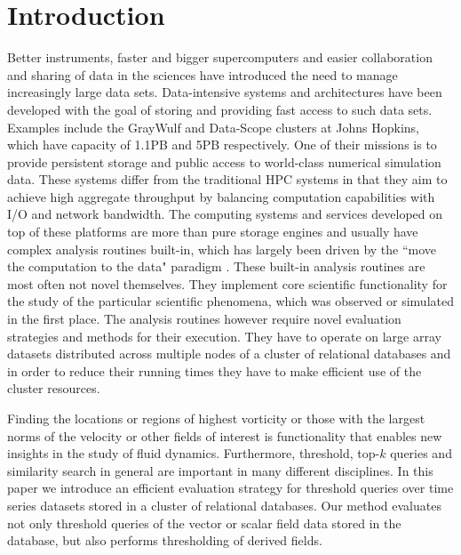 \documentclass{sig-alternate}
\begin{document}
\section{Introduction}
Better instruments, faster and bigger supercomputers and easier collaboration and sharing of data in the sciences have introduced the need
to manage increasingly large data sets. Data-intensive systems and architectures have been developed with the goal of storing and providing
fast access to such data sets. Examples include the GrayWulf and Data-Scope clusters \cite{Szalay, DataScope} at Johns Hopkins, which have capacity 
of 1.1PB and 5PB
respectively. One of their missions is to provide persistent storage and public access to world-class numerical simulation data. 
These systems differ from the traditional HPC systems in that they aim to achieve high aggregate throughput by balancing computation
capabilities with I/O and network bandwidth. The computing systems and services developed on top of these platforms are more than pure
storage engines and usually have complex analysis routines built-in, which has largely been driven by the ``move the computation to the data"
paradigm \cite{fourthparadigm}. These built-in analysis routines are most often not novel themselves. They implement core scientific functionality for the
study of the particular scientific phenomena, which was observed or simulated in the first place. The analysis routines however require novel evaluation
strategies and methods for their execution. They have to operate on large array datasets distributed across multiple nodes of a cluster of relational
databases and in order to reduce their running times they have to make efficient use of the cluster resources. 

Finding the locations or regions of highest vorticity or those with the largest norms of the velocity or other fields of interest is
functionality that enables new insights in the study of fluid dynamics. Furthermore, threshold, top-$k$ queries and similarity search in general
are important in many different disciplines. In this paper we introduce an efficient evaluation strategy for threshold
queries over time series datasets stored in a cluster of relational databases. Our method evaluates not only threshold queries of the vector or 
scalar field data stored in the database, but also performs thresholding of derived fields.
\end{document}
